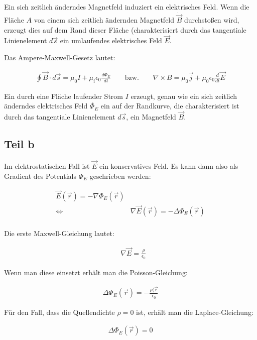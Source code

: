 \documentclass[a4paper,german,12pt,smallheadings]{scrartcl}
\begin{document}
Ein sich zeitlich änderndes Magnetfeld induziert ein elektrisches Feld. Wenn
die Fläche $A$ von einem sich zeitlich ändernden Magnetfeld $\dot{\vec{B}}$
durchstoßen wird, erzeugt dies auf dem Rand dieser Fläche (charakterisiert
durch das tangentiale Linienelement $d\vec{s}$ ein umlaufendes elektrisches
Feld $\vec{E}$.

Das Ampere-Maxwell-Gesetz lautet:

\begin{align*}
  \oint \vec{B} \cdot d\vec{s} = \mu_0 I + \mu_i \epsilon_0 \frac{d\Phi_{E}}{dt} \qquad\text{bzw.}\qquad \nabla \times B = \mu_0 \vec{j} + \mu_0 \epsilon_0 \frac{d}{dt} \vec{E}
\end{align*}

Ein durch eine Fläche laufender Strom $I$ erzeugt, genau wie ein sich zeitlich
änderndes elektrisches Feld $\dot{\Phi_{E}}$ ein auf der Randkurve, die
charakterisiert ist durch das tangentiale Linienelement $d\vec{s}$, ein
Magnetfeld $\vec{B}$.

\subsection*{Teil b}

Im elektrostatischen Fall ist $\vec{E}$ ein konservatives Feld. Es kann dann
also als Gradient des Potentials $\Phi_{E}$ geschrieben werden:

\begin{align*}
  \vec{E}(\vec{r}) = -\nabla \Phi_{E}(\vec{r}) \\
  \Leftrightarrow\quad&\nabla \vec{E}(\vec{r}) = -\Delta \Phi_{E}(\vec{r}) \\
\end{align*}

Die erste Maxwell-Gleichung lautet:

\begin{align*}
  &\nabla \vec{E} = \frac{\rho}{\epsilon_0}
\end{align*}

Wenn man diese einsetzt erhält man die Poisson-Gleichung:

\begin{align*}
  \Delta \Phi_{E}(\vec{r}) = -\frac{\rho(\vec{r}}{\epsilon_0}
\end{align*}

Für den Fall, dass die Quellendichte $\rho = 0$ ist, erhält man die
Laplace-Gleichung:

\begin{align*}
  \Delta \Phi_{E}(\vec{r}) = 0
\end{align*}
\end{document}
